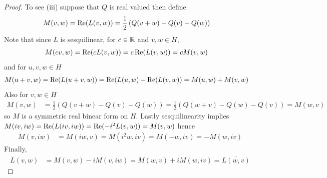 \begin{proof}
To see (iii) suppose that $Q$ is real valued then define
\begin{align*}
M(v,w) &= \operatorname*{Re} (L(v,w))  = \frac{1}{2} \left( Q(v+w) - Q(v) - Q(w) \right)
\end{align*}
Note that since $L$ is sesquilinear, for $c \in \mathbb{R}$ and $v,w \in H$,
\begin{align*}
M(cv, w) &= \operatorname*{Re} (c L(v,w)) =c \operatorname*{Re} ( L(v,w)) = cM(v,w)
\end{align*}
and for $u,v,w \in H$
\begin{align*}
M(u+v, w) &= \operatorname*{Re} (L(u+v,w)) =\operatorname*{Re} ( L(u,w) + \operatorname*{Re} ( L(v,w)) = M(u,w) + M(v,w)
\end{align*}
Also for $v,w \in H$
\begin{align*}
M(v,w) &= \frac{1}{2} \left( Q(v+w) - Q(v) - Q(w) \right) = \frac{1}{2} \left( Q(w+v) - Q(w) - Q(v) \right) = M(w,v)
\end{align*}
so $M$ is a symmetric real binear form on $H$.  Lastly sesquilinearity implies $M(iv,iw) = \operatorname*{Re} ( L(iv,iw)) = \operatorname*{Re} (-i^2 L(v,w)) = M(v,w)$ hence 
\begin{align*}
M(v,iw) &= M(iw, v) = M(i^2w, iv) = M(-w, iv) = -M(w,iv)
\end{align*}
Finally,
\begin{align*}
L(v,w) &= M(v,w) - i M(v,iw) = M(w,v) + i M(w, iv) = \overline{L(w, v)}
\end{align*}
\end{proof}

